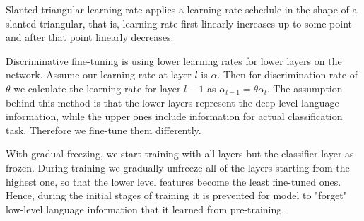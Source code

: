 \documentclass[../main.tex]{subfiles}
\begin{document}
Slanted triangular learning rate applies a learning rate schedule in the shape of a slanted triangular, that is, learning rate first linearly increases up to some point and after that point linearly decreases. 

Discriminative fine-tuning is using lower learning rates for lower layers on the network. Assume our learning rate at layer $l$ is $\alpha$. Then for discrimination rate of $\theta$ we calculate the learning rate for layer $l-1$ as $\alpha_{l-1} = \theta \alpha_l$. The assumption behind this method is that the lower layers represent the deep-level language information, while the upper ones include information for actual classification task. Therefore we fine-tune them differently. 

With gradual freezing, we start training with all layers but the classifier layer as frozen. During training we gradually unfreeze all of the layers starting from the highest one, so that the lower level features become the least fine-tuned ones. Hence, during the initial stages of training it is prevented for model to "forget" low-level language information that it learned from pre-training.
\end{document}
